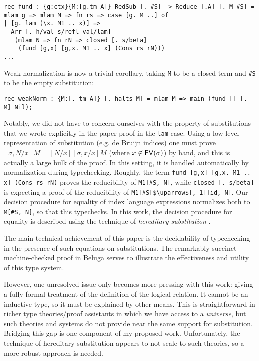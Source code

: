 \documentclass{article}
\begin{document}
\begin{lstlisting}
rec fund : {g:ctx}{M:[g.tm A]} RedSub [. #S] -> Reduce [.A] [. M #S] =
mlam g => mlam M => fn rs => case [g. M ..] of
| [g. lam (\x. M1 .. x)] =>
  Arr [. h/val s/refl val/lam]
   (mlam N => fn rN => closed [. s/beta]
    (fund [g,x] [g,x. M1 .. x] (Cons rs rN)))
...
\end{lstlisting}

Weak normalization is now a trivial corollary, taking \lstinline{M} to be a closed term and
\lstinline{#S} to be the empty substitution:

\begin{lstlisting}
rec weakNorm : {M:[. tm A]} [. halts M] = mlam M => main (fund [] [. M] Nil);
\end{lstlisting}

Notably, we did not have to concern
ourselves with the property of substitutions that we wrote explicitly
in the paper proof in the \lstinline{lam} case. Using a low-level representation
of substitution (e.g. de Bruijn indices) one must prove $[\sigma,N/x]M = [N/x][\sigma,x/x]M$
(where $x \not\in \mathsf{FV}(\sigma)$) by hand, and this is actually a large
bulk of the proof. In this setting, it is handled automatically
by normalization during typechecking. Roughly, the
term \lstinline{fund [g,x] [g,x. M1 .. x] (Cons rs rN)} proves
the reducibility of \lstinline{M1[#S, N]}, while
\lstinline{closed [. s/beta]} is expecting a proof of the reducibility
of
\lstinline{M1[#S[$\uparrow$], 1][id, N]}. Our decision procedure for
equality of index language expressions normalizes both to
\lstinline{M[#S, N]}, so that this typechecks. In this work, the
decision procedure for equality is described using the technique of
\emph{hereditary substitution} \citep{Watkins02tr}. 


The main technical achievement of this paper is the decidability of
typechecking in the presence of such equations on substitutions. The
remarkably succinct machine-checked proof in Beluga serves to
illustrate the effectiveness and utility of this type system. 

However, one unresolved issue only becomes more pressing with this work: giving a
fully formal treatment of the definition of the logical 
relation. It cannot be an inductive type, so it must be explained by
other means. This is straightforward in richer type theories/proof
assistants in which we have access to a \emph{universe}, but such
theories and systems do not provide near the same support for
substitution. Bridging this gap is one component of my proposed
work. Unfortunately, the technique of hereditary substitution appears
to not scale to such theories, so a more robust approach is needed.
\end{document}
